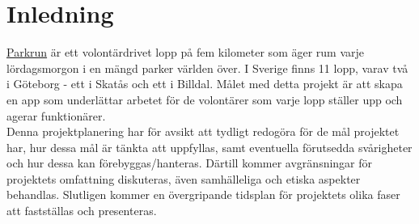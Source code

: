 \section{Inledning} 
\href{https://www.parkrun.se/}{Parkrun} är ett volontärdrivet lopp på fem kilometer som äger rum varje lördagsmorgon i en mängd parker världen över. I Sverige finns 11 lopp, varav två i Göteborg - ett i Skatås och ett i Billdal. Målet med detta projekt är att skapa en app som underlättar arbetet för de volontärer som varje lopp ställer upp och agerar funktionärer. \\
Denna projektplanering har för avsikt att tydligt redogöra för de mål projektet har, hur dessa mål är tänkta att uppfyllas, samt eventuella förutsedda svårigheter och hur dessa kan förebyggas/hanteras. Därtill kommer avgränsningar för projektets omfattning diskuteras, även samhälleliga och etiska aspekter behandlas. Slutligen kommer en övergripande tidsplan för projektets olika faser att fastställas och presenteras.

